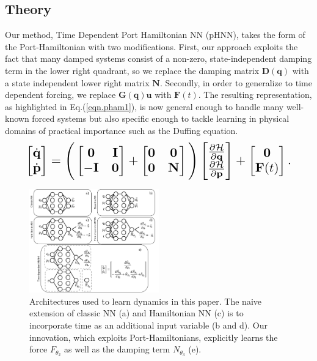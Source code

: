 \documentclass{article}
\begin{document}
\subsection{Theory}
Our method, Time Dependent Port Hamiltonian NN (pHNN), takes the form of the Port-Hamiltonian with two modifications. First, our approach exploits the fact that many damped systems consist of a non-zero, state-independent damping term in the lower right quadrant, so we replace the damping matrix $\mathbf{D}(\mathbf{q})$ with a state independent lower right matrix $\mathbf{N}$. Secondly, in order to generalize to time dependent forcing, we replace $\mathbf{G}(\mathbf{q})\mathbf{u}$ with $\mathbf{F}(t)$. The resulting representation, as highlighted in Eq.(\ref{eqn.pham1}), is now general enough to handle many well-known forced systems but also specific enough to tackle learning in physical domains of practical importance such as the Duffing equation.
\begin{equation}
\resizebox{0.9\linewidth}{!}{$%
\begin{bmatrix}
\dot{\mathbf{q}} \\
\dot{\mathbf{p}}
\end{bmatrix}
=
\Bigg(\begin{bmatrix}
\mathbf{0} & \mathbf{I} \\
-\mathbf{I} & \mathbf{0}
\end{bmatrix} +
\begin{bmatrix}
\mathbf{0} & \mathbf{0} \\
\mathbf{0} & \mathbf{N}
\end{bmatrix}
 \Bigg)
 \begin{bmatrix}
\frac{\partial \mathcal{H}}{\partial \mathbf{q}} \\
\frac{\partial \mathcal{H}}{\partial \mathbf{p}}
\end{bmatrix}
+
\begin{bmatrix}
\mathbf{0} \\
\mathbf{F}(t)
\end{bmatrix}.
$%
}%
\label{eqn.pham1}
\end{equation}
\begin{figure}[h!]
\centering
\includegraphics[width=0.5\textwidth]{figures/architecture2.pdf}
\caption{Architectures used to learn dynamics in this paper. The naive extension of classic NN (a) and Hamiltonian NN (c) is to incorporate time as an additional input variable (b and d). Our innovation, which exploits Port-Hamiltonians, explicitly learns the force $F_{\theta_2}$ as well as the damping term $N_{\theta_3}$ (e).}
\label{fig.architecture}
\end{figure}
\end{document}
